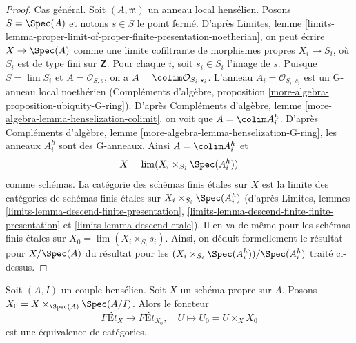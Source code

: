 \begin{proof}
\medskip\noindent
Cas général. Soit $(A, \mathfrak m)$ un anneau local hensélien.
Posons $S = \Spec(A)$ et notons $s \in S$ le point fermé. D'après Limites, lemme
\ref{limits-lemma-proper-limit-of-proper-finite-presentation-noetherian},
on peut écrire $X \to \Spec(A)$ comme une limite cofiltrante de
morphismes propres $X_i \to S_i$, où $S_i$ est de type fini sur $\mathbf{Z}$.
Pour chaque $i$, soit $s_i \in S_i$ l'image de $s$.
Puisque $S = \lim S_i$ et $A = \mathcal{O}_{S, s}$, on a
$A = \colim \mathcal{O}_{S_i, s_i}$. L'anneau $A_i = \mathcal{O}_{S_i, s_i}$
est un G-anneau local noethérien (Compléments d'algèbre, proposition
\ref{more-algebra-proposition-ubiquity-G-ring}).
D'après Compléments d'algèbre, lemme \ref{more-algebra-lemma-henselization-colimit},
on voit que $A = \colim A_i^h$. D'après
Compléments d'algèbre, lemme \ref{more-algebra-lemma-henselization-G-ring},
les anneaux $A_i^h$ sont des G-anneaux. Ainsi $A = \colim A_i^h$ et
$$
X = \lim (X_i \times_{S_i} \Spec(A_i^h))
$$
comme schémas. La catégorie des schémas finis étales sur $X$ est la limite
des catégories de schémas finis étales sur
$X_i \times_{S_i} \Spec(A_i^h)$ (d'après
Limites, lemmes
\ref{limits-lemma-descend-finite-presentation},
\ref{limits-lemma-descend-finite-finite-presentation} et
\ref{limits-lemma-descend-etale}).
Il en va de même pour les schémas finis étales sur
$X_0 = \lim (X_i \times_{S_i} s_i)$.
Ainsi, on déduit formellement le résultat pour $X / \Spec(A)$
du résultat pour les $(X_i \times_{S_i} \Spec(A_i^h)) / \Spec(A_i^h)$
traité ci-dessus.
\end{proof}

\begin{lemma}
\label{lemma-finite-etale-on-proper-over-henselian-pair}
Soit $(A, I)$ un couple hensélien. Soit $X$ un schéma propre sur $A$.
Posons $X_0 = X \times_{\Spec(A)} \Spec(A/I)$. Alors le foncteur
$$
\textit{F\'Et}_X \to \textit{F\'Et}_{X_0},\quad
U \longmapsto U_0 = U \times_X X_0
$$
est une équivalence de catégories.
\end{lemma}

